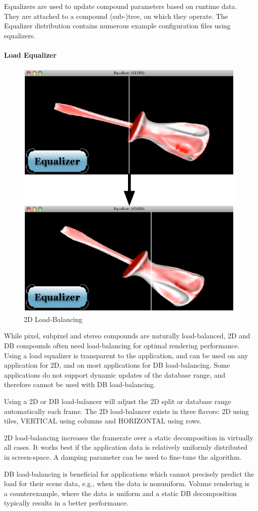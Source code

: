 \documentclass[10pt,a4]{scrartcl}
\begin{document}
Equalizers are used to update compound parameters based on runtime
data. They are attached to a compound (sub-)tree, on which they
operate. The Equalizer distribution contains numerous example
configuration files using equalizers.

\paragraph{Load Equalizer}
\vspace{-2ex}\begin{figure}
  \includegraphics[width=.382\textwidth]{images/lb.pdf}
  {\caption{\label{fLoadBalancing}\small 2D Load-Balancing}}
\end{figure}
While pixel, subpixel and stereo compounds are naturally load-balanced, 2D and
DB compounds often need load-balancing for optimal rendering performance. Using
a load equalizer is transparent to the application, and can be used on any
application for 2D, and on most applications for DB load-balancing. Some
applications do not support dynamic updates of the database range, and therefore
cannot be used with DB load-balancing.

Using a 2D or DB load-balancer will adjust the 2D split or database range
automatically each frame. The 2D load-balancer exists in three flavors:
\textsf{2D} using tiles, \textsf{VERTICAL} using columns and
\textsf{HORIZONTAL} using rows.

2D load-balancing increases the framerate over a static decomposition in
virtually all cases. It works best if the application data is relatively
uniformly distributed in screen-space. A damping parameter can be used
to fine-tune the algorithm.

DB load-balancing is beneficial for applications which cannot precisely
predict the load for their scene data, e.g., when the data is
nonuniform. Volume rendering is a counterexample, where the data is
uniform and a static DB decomposition typically results in a better
performance.
\end{document}
